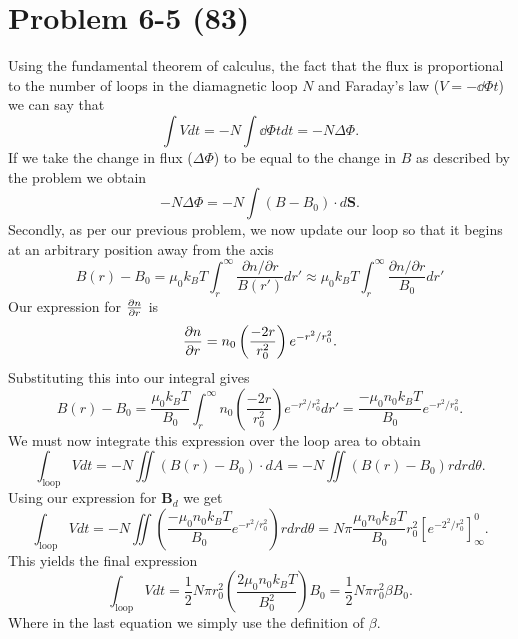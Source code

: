 \section*{Problem 6-5 (83)}
\label{sec:6-5}
Using the fundamental theorem of calculus, the fact that the flux is proportional to the number of loops in the diamagnetic loop \(N\) and Faraday's law (\(V = -\dd{\Phi}{t}  \)) we can say that 
\begin{equation*}
	\int V dt = -N\int\dd{\Phi}{t}dt = -N\Delta\Phi.
\end{equation*}
If we take the change in flux (\(\Delta\Phi \)) to be equal to the change in \(B\) as described by the problem we obtain
\begin{equation*}
	-N\Delta\Phi = -N\int(B - B_0)\cdot d\bm{S}.
\end{equation*}
Secondly, as per our previous problem, we now update our loop so that it begins at an arbitrary position away from the axis
\begin{equation*}
	B(r) - B_0 = \mu_0k_BT\int_r^\infty\dfrac{\partial n/\partial r}{B(r')}dr' \approx \mu_0k_BT\int_r^\infty\dfrac{\partial n/\partial r}{B_0}dr'
\end{equation*}
Our expression for \(\frac{\partial n}{\partial r} \) is 
\begin{equation*}
	\frac{\partial n}{\partial r} = n_0\left(\dfrac{-2r}{r^2_0} \right) e^{-r^2/r_0^2}.
\end{equation*}
Substituting this into our integral gives
\begin{equation*}
	B(r) - B_0 = \dfrac{\mu_0k_BT}{B_0}\int_r^\infty n_0\left(\dfrac{-2r}{r^2_0} \right) e^{-r^2/r_0^2}dr' = \dfrac{-\mu_0n_0k_BT}{B_0}e^{-r^2/r_0^2}.
\end{equation*}
We must now integrate this expression over the loop area to obtain
\begin{equation*}
	\int_\text{loop} V dt = -N\iint(B(r) - B_0)\cdot dA = -N\iint \left(B(r) - B_0\right)rdrd\theta.
\end{equation*}
Using our expression for \(\bm{B}_d \) we get
\begin{equation*}
	\int_\text{loop} V dt = -N\iint \left( \dfrac{-\mu_0n_0k_BT}{B_0}e^{-r^2/r_0^2}\right)rdrd\theta = N\pi\dfrac{\mu_0n_0k_BT}{B_0}r_0^2\left[e^{-2^2/r_0^2}\right]^0_\infty.
\end{equation*}
This yields the final expression
\begin{equation*}
	\int_\text{loop} V dt = \dfrac{1}{2}N\pi r^2_0\left(\dfrac{2\mu_0n_0k_BT}{B_0^2}\right)B_0 = \dfrac{1}{2}N\pi r^2_0\beta B_0.
\end{equation*}
Where in the last equation we simply use the definition of \(\beta \).

